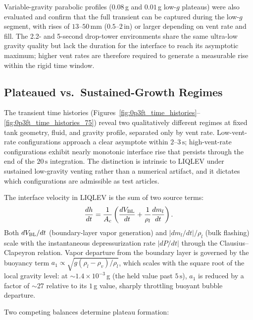 \documentclass[conf]{new-aiaa}
\begin{document}
Variable-gravity parabolic profiles ($0.08\,$g and $0.01\,$g low-$g$ plateaus) were also evaluated and confirm that the full transient can be captured during the low-$g$ segment, with rises of $13$--$50\,\text{mm}$ ($0.5$--$2\,\text{in}$) or larger depending on vent rate and fill. The 2.2- and 5-second drop-tower environments share the same ultra-low gravity quality but lack the duration for the interface to reach its asymptotic maximum; higher vent rates are therefore required to generate a measurable rise within the rigid time window.


\subsection{Plateaued vs.\ Sustained-Growth Regimes}
\label{sec:plateaued_vs_sustained}

The transient time histories (Figures~\ref{fig:0p3ft_time_histories}--\ref{fig:0p3ft_time_histories_75}) reveal two qualitatively different regimes at fixed tank geometry, fluid, and gravity profile, separated only by vent rate. Low-vent-rate configurations approach a clear asymptote within $2$--$3\,\text{s}$; high-vent-rate configurations exhibit nearly monotonic interface rise that persists through the end of the $20\,\text{s}$ integration. The distinction is intrinsic to LIQLEV under sustained low-gravity venting rather than a numerical artifact, and it dictates which configurations are admissible as test articles.

The interface velocity in LIQLEV is the sum of two source terms:
\[
\frac{dh}{dt} = \frac{1}{A_c}\left(\frac{dV_{\rm BL}}{dt} + \frac{1}{\rho_l}\frac{dm_l}{dt}\right).
\]
Both $dV_{\rm BL}/dt$ (boundary-layer vapor generation) and $|dm_l/dt|/\rho_l$ (bulk flashing) scale with the instantaneous depressurization rate $|dP/dt|$ through the Clausius--Clapeyron relation. Vapor departure from the boundary layer is governed by the buoyancy term $a_1 \propto \sqrt{g(\rho_l - \rho_v)/\rho_l}$, which scales with the square root of the local gravity level: at $\sim 1.4 \times 10^{-3}\,$g (the held value past $5\,\text{s}$), $a_1$ is reduced by a factor of $\sim$27 relative to its $1\,$g value, sharply throttling buoyant bubble departure.

Two competing balances determine plateau formation:
\end{document}
